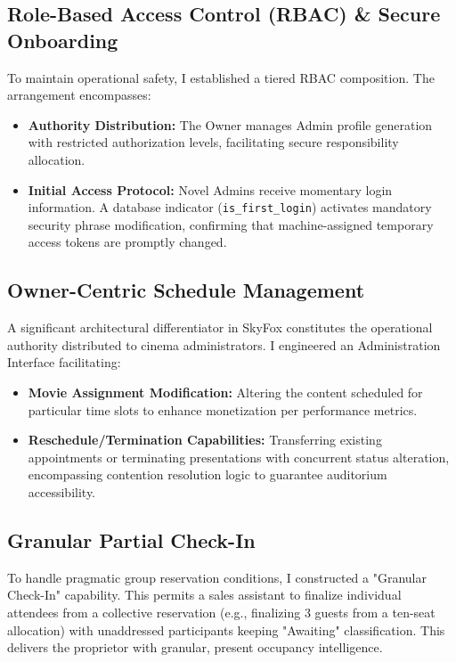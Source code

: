 \subsection{Role-Based Access Control (RBAC) \& Secure Onboarding}
To maintain operational safety, I established a tiered RBAC composition. The arrangement 
encompasses:
\begin{itemize}
    \item \textbf{Authority Distribution:} The Owner manages Admin profile generation with 
    restricted authorization levels, facilitating secure responsibility allocation.
    \item \textbf{Initial Access Protocol:} Novel Admins receive momentary login information. 
    A database indicator (\texttt{is\_first\_login}) activates mandatory security phrase 
    modification, confirming that machine-assigned temporary access tokens are promptly changed.
\end{itemize}

\subsection{Owner-Centric Schedule Management}
A significant architectural differentiator in SkyFox constitutes the operational 
authority distributed to cinema administrators. I engineered an Administration Interface 
facilitating:
\begin{itemize}
    \item \textbf{Movie Assignment Modification:} Altering the content scheduled for 
    particular time slots to enhance monetization per performance metrics.
    \item \textbf{Reschedule/Termination Capabilities:} Transferring existing appointments 
    or terminating presentations with concurrent status alteration, encompassing contention 
    resolution logic to guarantee auditorium accessibility.
\end{itemize}

\subsection{Granular Partial Check-In}
To handle pragmatic group reservation conditions, I constructed a "Granular Check-In" 
capability. This permits a sales assistant to finalize individual attendees from a 
collective reservation (e.g., finalizing 3 guests from a ten-seat allocation) with 
unaddressed participants keeping "Awaiting" classification. This delivers the proprietor 
with granular, present occupancy intelligence.

